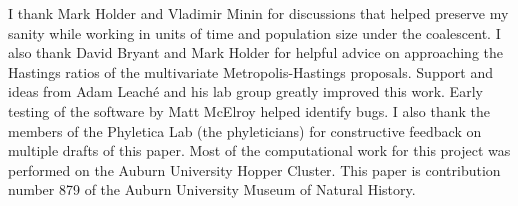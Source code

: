 I thank Mark Holder and Vladimir Minin for discussions that helped preserve my
sanity while working in units of time and population size under the coalescent.
I also thank David Bryant and Mark Holder for helpful advice on approaching the
Hastings ratios of the multivariate Metropolis-Hastings proposals.
Support and ideas from Adam Leach\'e and his lab group greatly improved this
work.
Early testing of the software by Matt McElroy helped identify bugs.
I also thank the members of the Phyletica Lab (the phyleticians) for
constructive feedback on multiple drafts of this paper.
Most of the computational work for this project was performed on the
Auburn University Hopper Cluster.
This paper is contribution number 879 of the Auburn University
Museum of Natural History.


